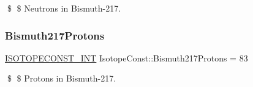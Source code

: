 \$ \$ Neutrons in Bismuth-\/217. \mbox{\label{group___isotope_const-_bismuth-_bi217_ga388bc3362edc22bcec1b32ef064ba9a9}} 
\subsubsection{\texorpdfstring{Bismuth217\+Protons}{Bismuth217Protons}}
{\footnotesize\ttfamily \mbox{\hyperlink{group___isotope_const-_macros_ga5f18360b3e99483a35c32d789e62621c}{I\+S\+O\+T\+O\+P\+E\+C\+O\+N\+S\+T\+\_\+\+I\+NT}} Isotope\+Const\+::\+Bismuth217\+Protons = 83}

\$ \$ Protons in Bismuth-\/217. 